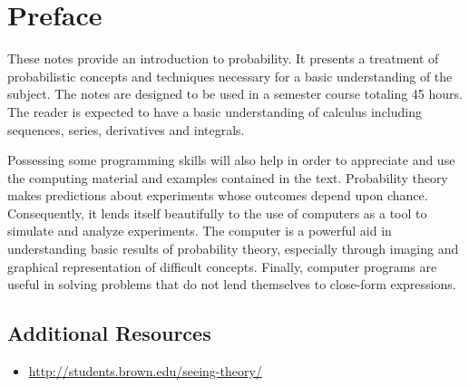 \chapter*{Preface}

These notes provide an introduction to probability.
It presents a treatment of probabilistic concepts and techniques necessary for a basic understanding of the subject.
The notes are designed to be used in a semester course totaling 45 hours.
The reader is expected to have a basic understanding of calculus including sequences, series, derivatives and integrals.

Possessing some programming skills will also help in order to appreciate and use the computing material and examples contained in the text.
Probability theory makes predictions about experiments whose outcomes depend upon chance.
Consequently, it lends itself beautifully to the use of computers as a tool to simulate and analyze experiments.
The computer is a powerful aid in understanding basic results of probability theory, especially through imaging and graphical representation of difficult concepts.
Finally, computer programs are useful in solving problems that do not lend themselves to close-form expressions.

\section*{Additional Resources}

\begin{itemize}
\item \url{http://students.brown.edu/seeing-theory/}
\end{itemize}

